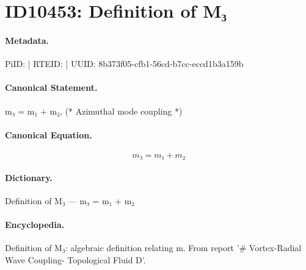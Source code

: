 \section*{ID10453: Definition of M₃}
\paragraph{Metadata.}
PiID:  | RTEID:  | UUID: 8b373f05-cfb1-56cd-b7cc-eccd1b3a159b

\paragraph{Canonical Statement.}
m₃ = m₁ + m₂, (* Azimuthal mode coupling *)

\paragraph{Canonical Equation.}
\[
m₃ = m₁ + m₂
\]

\paragraph{Dictionary.}
Definition of M₃ — m₃ = m₁ + m₂

\paragraph{Encyclopedia.}
Definition of M₃: algebraic definition relating m. From report '\# Vortex-Radial Wave Coupling- Topological Fluid D'.
